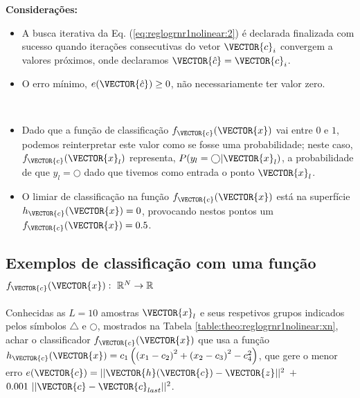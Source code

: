 \begin{theorem}
\textbf{Considerações:}
\begin{itemize}
\item A busca iterativa da Eq. (\ref{eq:reglogrnr1nolinear:2}) 
é declarada finalizada com sucesso 
quando iterações consecutivas do vetor $\VECTOR{c}_i$ convergem a valores próximos, onde declaramos $\VECTOR{\hat{c}}=\VECTOR{c}_i$.
\item O erro mínimo, $e(\VECTOR{\hat{c}}) \geq 0$, não necessariamente ter valor zero. 
\end{itemize}
\end{theorem}
~

\begin{tcbattention}
\begin{itemize}
\item Dado que a função de classificação $f_{\VECTOR{c}}(\VECTOR{x})$ vai entre $0$ e $1$,
podemos reinterpretar este valor como se fosse uma probabilidade;
neste caso, $f_{\VECTOR{c}}(\VECTOR{x}_l)$ representa, $P(y_l=\bigcirc|\VECTOR{x}_l)$, 
a probabilidade de que $y_l=\bigcirc$ dado que tivemos como entrada o ponto $\VECTOR{x}_l$.
\item O limiar de classificação na função $f_{\VECTOR{c}}(\VECTOR{x})$ está na superfície $h_{\VECTOR{c}}(\VECTOR{x})=0$,
provocando nestos pontos um $f_{\VECTOR{c}}(\VECTOR{x})=0.5$.
\end{itemize}
\end{tcbattention}

\subsection{Exemplos de classificação com uma função
$f_{\VECTOR{c}}(\VECTOR{x}):~\mathbb{R}^N \rightarrow \mathbb{R}$ }

\begin{example}\label{ex:theo:reglogrnr1nolinear}
Conhecidas as $L=10$ amostras $\VECTOR{x}_l$ e seus respetivos grupos indicados pelos símbolos $\bigtriangleup$ e $\bigcirc$, 
mostrados na Tabela \ref{table:theo:reglogrnr1nolinear:xn},
achar o classificador $f_{\VECTOR{c}}(\VECTOR{x})$ que usa a função 
$h_{\VECTOR{c}}(\VECTOR{x})=c_1\left( \left(x_1-c_2\right)^2 + \left(x_2-c_3\right)^2 -c_4^2\right)$, 
que gere o menor erro $e(\VECTOR{c}) =  ||\VECTOR{h}(\VECTOR{c})-\VECTOR{z}||^2$ $+$ $0.001~||\VECTOR{c}-\VECTOR{c}_{last}||^2$.
\end{example}


